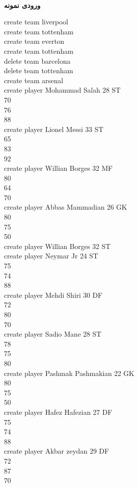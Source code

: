 \documentclass[]{article}
\newcommand{\inputsample}[1]{
    ~\\
    \textbf{ورودی نمونه}
    ~\\
    \begin{tcolorbox}[breakable,boxrule=0pt]
        \begin{latin}
            \large{
                #1
            }
        \end{latin}
    \end{tcolorbox}
}
\begin{document}
\inputsample{
create team liverpool\\
create team tottenham\\
create team everton\\
create team tottenham\\
delete team barcelona\\
delete team tottenham\\
create team arsenal\\
create player Mohammad Salah 28 ST\\
70\\
76\\
88\\
create player Lionel Messi 33 ST\\
65\\
83\\
92\\
create player Willian Borges 32 MF\\
80\\
64\\
70\\
create player Abbas Mammadian 26 GK\\
80\\
75\\
50\\
create player Willian Borges 32 ST\\
create player Neymar Jr 24 ST\\
75\\
74\\
88\\
create player Mehdi Shiri 30 DF\\
72\\
80\\
70\\
create player Sadio Mane 28 ST\\
78\\
75\\
80\\
create player Pashmak Pashmakian 22 GK\\
80\\
75\\
50\\
create player Hafez Hafezian 27 DF\\
75\\
74\\
88\\
create player Akbar zeydan 29 DF\\
72\\
87\\
70\\
}
\end{document}
